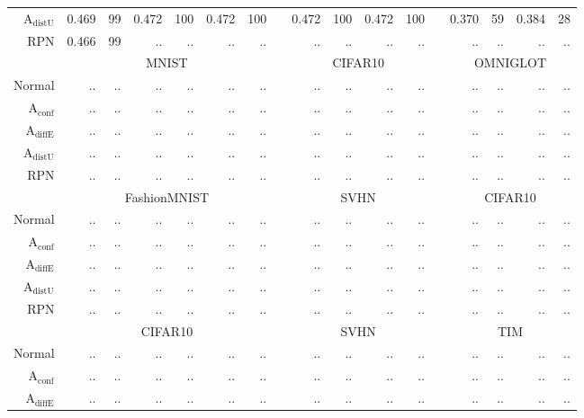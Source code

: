 \begin{table}[ht]
\begin{tiny}
\begin{tabular}{@{}rrrrrrrcrrrrcrrrr@{}}
			$\mathrm{A}_{\mathrm{distU}}$ & 0.469 & 99 & 0.472 & 100 & 0.472 & 100 & & 0.472 & 100 & 0.472 & 100 & & 0.370 & 59 & 0.384 & 28 \\
			RPN                           & 0.466 & 99 & .. & .. & .. & .. & & .. & .. & .. & .. & & .. & .. & .. & .. \\
			\midrule
			& \multicolumn{6}{c}{MNIST}   & & \multicolumn{4}{c}{CIFAR10} & & \multicolumn{4}{c}{OMNIGLOT} \\
			Normal                         & .. & .. & .. & .. & .. & .. & & .. & .. & .. & .. & & .. & .. & .. & .. \\
			$\mathrm{A}_{\mathrm{conf}}$  & .. & .. & .. & .. & .. & .. & & .. & .. & .. & .. & & .. & .. & .. & .. \\
			$\mathrm{A}_{\mathrm{diffE}}$ & .. & .. & .. & .. & .. & .. & & .. & .. & .. & .. & & .. & .. & .. & .. \\
			$\mathrm{A}_{\mathrm{distU}}$ & .. & .. & .. & .. & .. & .. & & .. & .. & .. & .. & & .. & .. & .. & .. \\
			RPN                           & .. & .. & .. & .. & .. & .. & & .. & .. & .. & .. & & .. & .. & .. & .. \\
			\midrule
			& \multicolumn{6}{c}{FashionMNIST} & & \multicolumn{4}{c}{SVHN} & & \multicolumn{4}{c}{CIFAR10} \\
			Normal                         & .. & .. & .. & .. & .. & .. & & .. & .. & .. & .. & & .. & .. & .. & .. \\
			$\mathrm{A}_{\mathrm{conf}}$  & .. & .. & .. & .. & .. & .. & & .. & .. & .. & .. & & .. & .. & .. & .. \\
			$\mathrm{A}_{\mathrm{diffE}}$ & .. & .. & .. & .. & .. & .. & & .. & .. & .. & .. & & .. & .. & .. & .. \\
			$\mathrm{A}_{\mathrm{distU}}$ & .. & .. & .. & .. & .. & .. & & .. & .. & .. & .. & & .. & .. & .. & .. \\
			RPN                           & .. & .. & .. & .. & .. & .. & & .. & .. & .. & .. & & .. & .. & .. & .. \\
			\midrule
			& \multicolumn{6}{c}{CIFAR10} & & \multicolumn{4}{c}{SVHN} & & \multicolumn{4}{c}{TIM} \\
			Normal                         & .. & .. & .. & .. & .. & .. & & .. & .. & .. & .. & & .. & .. & .. & .. \\
			$\mathrm{A}_{\mathrm{conf}}$  & .. & .. & .. & .. & .. & .. & & .. & .. & .. & .. & & .. & .. & .. & .. \\
			$\mathrm{A}_{\mathrm{diffE}}$ & .. & .. & .. & .. & .. & .. & & .. & .. & .. & .. & & .. & .. & .. & .. \\

\end{tabular}
\end{tiny}
\end{table}
